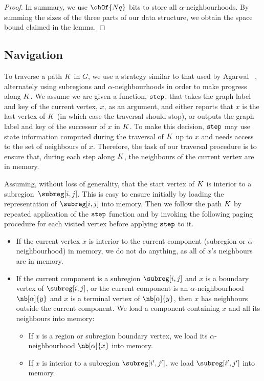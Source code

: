 {\begin{proof}
  In summary, we use $\ohOf{N \bitsPerKey}$ bits to store all $\alpha$-neighbourhoods.
  By summing the sizes of the three parts of
  our data structure, we obtain the space bound claimed in the lemma.
\end{proof}

\subsection{Navigation}

\label{sec:navigation}

To traverse a path $K$ in $G$, we use a strategy similar to that used
by Agarwal \etal~\cite{DBLP:conf/soda/AgarwalAMVV98},
alternately using subregions and $\alpha$-neighbourhoods in order to make
progress along $K$.
We assume we are given a function, $\texttt{step}$, that takes the graph label
and key of the current vertex, $x$, as an argument, and either reports that $x$
is the last vertex of $K$ (in which case the traversal should stop), or outputs
the graph label and key of the successor of $x$ in $K$.
To make this decision, $\texttt{step}$ may
use state information computed during the traversal of $K$ up to $x$
and needs access to the set of neighbours of $x$.
Therefore, the task of our traversal procedure is to ensure that, during each step
along $K$, the neighbours of the current vertex are in memory.

Assuming, without loss of generality, that the start vertex of $K$ is 
interior to a subregion~$\subreg[i,j]$.
This is easy to ensure initially by loading the
representation of $\subreg[i,j]$ into memory.
Then we follow the path $K$ by repeated application of the $\texttt{step}$ function
and by invoking the following paging procedure for each visited vertex before
applying $\texttt{step}$ to it.
\begin{itemize}
\item If the current vertex $x$ is interior to the current component
  (subregion or $\alpha$-neighbourhood) in memory, we do not do
  anything, as all of $x$'s neighbours are in memory.
\item If the current component is a subregion $\subreg[i,j]$ and $x$ is a
  boundary vertex of $\subreg[i,j]$, or the current component is an
  $\alpha$-neighbourhood $\nb[\alpha]{y}$ and $x$ is a terminal vertex of
  $\nb[\alpha]{y}$, then $x$ has neighbours outside the current
  component.
  We load a component containing $x$ and all its neighbours into memory:
  \begin{itemize}
  \item If $x$ is a region or subregion boundary vertex, we load its
    $\alpha$-neighbourhood $\nb[\alpha]{x}$ into memory.
  \item If $x$ is interior to a subregion $\subreg[i',j']$, we load
    $\subreg[i',j']$ into memory.
  \end{itemize}
\end{itemize}

}
